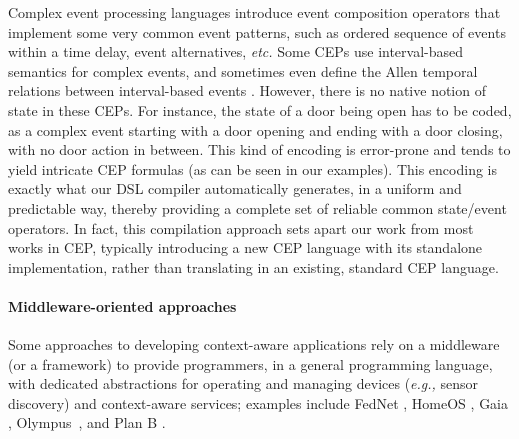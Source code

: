 Complex event processing languages \cite{Cugola:2012:PFI:2187671.2187677} introduce event composition operators that implement some very common event patterns, such as ordered sequence of events within a time delay, event alternatives, {\em etc.} Some CEPs use interval-based semantics for complex events, and sometimes even define the Allen temporal relations between interval-based events \cite{Anicic2010, DBLP:conf/debs/LiMRL11, 7439303,  hausmann2014language}. However, there is no native notion of state in these CEPs. For instance, the state of a door being open has to be coded, as a complex event starting with a door opening and ending with a door closing, with no door action in between. This kind of encoding is error-prone and tends to yield intricate CEP formulas (as can be seen in our examples).  This encoding is exactly what our DSL compiler automatically generates, in a uniform and predictable way, thereby providing a complete set of reliable common state/event operators.
In fact, this compilation approach sets apart our work from most works in CEP, typically introducing a
new CEP language with its standalone implementation, rather than translating in an existing, standard CEP language.



\paragraph{Middleware-oriented approaches}

Some approaches to developing context-aware applications rely on a middleware (or a framework) to provide programmers, in a general programming language, with dedicated abstractions for operating and managing devices ({\em e.g.,} sensor discovery) and context-aware services; examples include 
FedNet \cite{7314a34a666f457aab238595568d5390}, HomeOS \cite{HomeOS}, Gaia \cite{Gaia}, Olympus~\cite{Olympus}, and Plan B \cite{DBLP:conf/percom/BallesterosSAM06}. 

